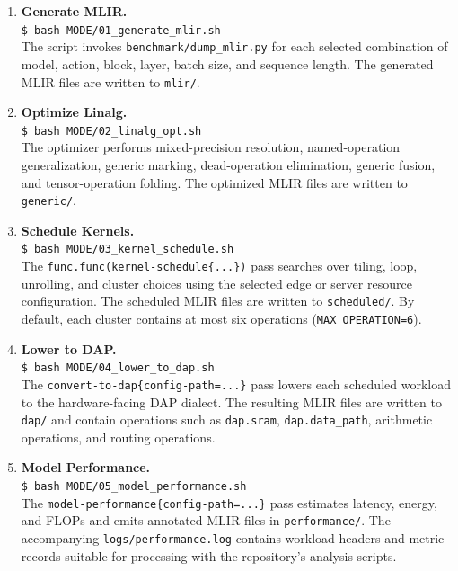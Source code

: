 \begin{enumerate}[leftmargin=2.4em,itemsep=0.45em]
  \item \textbf{Generate MLIR.}\\
  {\small \texttt{\$ bash MODE/01\_generate\_mlir.sh}}\\
  The script invokes \texttt{benchmark/dump\_mlir.py} for each selected
  combination of model, action, block, layer, batch size, and sequence
  length. The generated MLIR files are written to \texttt{mlir/}.

  \item \textbf{Optimize Linalg.}\\
  {\small \texttt{\$ bash MODE/02\_linalg\_opt.sh}}\\
  The optimizer performs mixed-precision resolution, named-operation
  generalization, generic marking, dead-operation elimination, generic
  fusion, and tensor-operation folding. The optimized MLIR files are
  written to \texttt{generic/}.

  \item \textbf{Schedule Kernels.}\\
  {\small \texttt{\$ bash MODE/03\_kernel\_schedule.sh}}\\
  The \texttt{func.func(kernel-schedule\{...\})} pass searches over tiling,
  loop, unrolling, and cluster choices using the selected edge or server
  resource configuration. The scheduled MLIR files are written to
  \texttt{scheduled/}. By default, each cluster contains at most six
  operations (\texttt{MAX\_OPERATION=6}).

  \item \textbf{Lower to DAP.}\\
  {\small \texttt{\$ bash MODE/04\_lower\_to\_dap.sh}}\\
  The \texttt{convert-to-dap\{config-path=...\}} pass lowers each scheduled
  workload to the hardware-facing DAP dialect. The resulting MLIR files
  are written to \texttt{dap/} and contain operations such as
  \texttt{dap.sram}, \texttt{dap.data\_path}, arithmetic operations, and
  routing operations.

  \item \textbf{Model Performance.}\\
  {\small \texttt{\$ bash MODE/05\_model\_performance.sh}}\\
  The \texttt{model-performance\{config-path=...\}} pass estimates latency,
  energy, and FLOPs and emits annotated MLIR files in \texttt{performance/}.
  The accompanying \texttt{logs/performance.log} contains workload headers
  and metric records suitable for processing with the repository's
  analysis scripts.
\end{enumerate}
